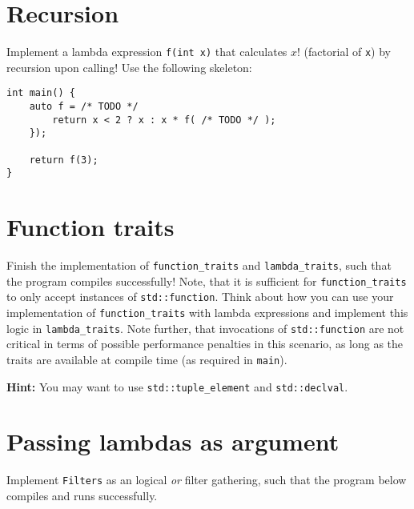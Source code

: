 \section{Recursion}
Implement a lambda expression \texttt{f(int x)} that calculates $x!$ (factorial of \texttt{x}) by recursion upon calling!
Use the following skeleton:
\begin{lstlisting}
int main() {
    auto f = /* TODO */
        return x < 2 ? x : x * f( /* TODO */ );
    });

    return f(3);
}
\end{lstlisting}

\section{Function traits}
\label{sec:fcttraits}
Finish the implementation of \texttt{function\_traits} and \texttt{lambda\_traits}, such that the program compiles successfully! Note, that it is sufficient for \texttt{function\_traits} to only accept instances of \texttt{std::function}. Think about how you can use your implementation of \texttt{function\_traits} with lambda expressions and implement this logic in \texttt{lambda\_traits}. Note further, that invocations of \texttt{std::function} are not critical in terms of possible performance penalties in this scenario, as long as the traits are available at compile time (as required in \texttt{main}).


\textbf{Hint:} You may want to use \texttt{std::tuple\_element} and \texttt{std::declval}.

\newpage

\section{Passing lambdas as argument}
Implement \texttt{Filters} as an logical \textit{or} filter gathering, such that the program below compiles and runs successfully.


